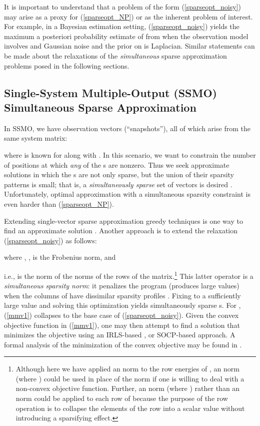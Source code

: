 \documentclass[final]{siamltex}
\newcommand{\la}[1]{\mbox{}}  \newcommand{\sst}[1]{\mbox{\scriptsize{#1}}}
\begin{document}
   It is important to understand that a problem of the form
   (\ref{sparseopt_noisy}) may arise as a proxy for (\ref{sparseopt_NP})
   or as the inherent problem of interest.  For example,
   in a Bayesian estimation setting, (\ref{sparseopt_noisy})
   yields the maximum a posteriori probability estimate of
    from  when the observation model involves 
   and Gaussian noise and the prior on  is Laplacian.
   Similar statements can be made about the relaxations of the
   \emph{simultaneous} sparse approximation problems posed in the
   following sections.

\subsection{Single-System Multiple-Output (SSMO) Simultaneous Sparse Approximation}

   In SSMO, we have  observation vectors (``snapshots''), all of
   which arise from the same system matrix:
   
   where  is known for 
   along with .  In this scenario,
   we want to constrain the number of positions at which \emph{any} of
   the s are nonzero.  Thus we seek approximate solutions in
   which the s are not only sparse, but the union of their
   sparsity patterns is small; that is, a {\em{simultaneously sparse}}
   set of vectors is desired \cite{Mal2005, Tro2006_II}.
   Unfortunately, optimal approximation with a simultaneous sparsity
   constraint is even harder than (\ref{sparseopt_NP}).

   Extending single-vector sparse approximation greedy techniques is
   one way to find an approximate solution \cite{Cot2005,Tro2006_I}.
   Another approach is to extend the relaxation
   (\ref{sparseopt_noisy}) as follows:
   
   where , ,  is the
   Frobenius norm, and
   
   i.e.,  is the  norm of the
    norms of the rows of the \la{G} matrix.\footnote{Although
   here we have applied an  norm to the  row energies
   of , an  norm (where ) could be used in
   place of the  norm if one is willing to deal with a
   non-convex objective function.  Further, an  norm (where ) rather than an  norm could be applied to each row of
    because the purpose of the row operation is to collapse
   the elements of the row into a scalar value without introducing a
   sparsifying effect.} This latter operator is a {\em{simultaneous
   sparsity norm}}: it penalizes the program (produces large values)
   when the columns of \la{G} have dissimilar sparsity profiles
   \cite{Mal2005}.  Fixing  to a sufficiently large value and
   solving this optimization yields simultaneously sparse s.
   For , (\ref{mmv1}) collapses to the base case of
   (\ref{sparseopt_noisy}).  Given the convex objective function in
   (\ref{mmv1}), one may then attempt to find a solution that
   minimizes the objective using an IRLS-based \cite{Cot2005}, or
   SOCP-based \cite{Mal2005} approach.  A formal analysis of the
   minimization of the convex objective may be found in
   \cite{Tro2006_II}.
\end{document}

